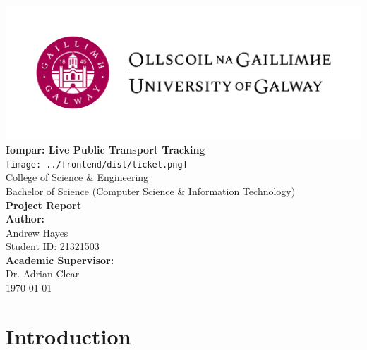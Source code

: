 \documentclass[a4paper,11pt]{report}
\author{Andrew Hayes}
\begin{document}
\begin{titlepage}
    \begin{center}

        \vfill
        \includegraphics[width=\textwidth]{./images/Logo-UGalway-2-3166136658.jpg} \\[1cm]

        {\Huge \textbf{Iompar: Live Public Transport Tracking}} \\[0.5cm]
        
        \texttt{[image: ../frontend/dist/ticket.png]} \\[1cm]

        {\Large College of Science \& Engineering} \\[0.3cm]
        {\large Bachelor of Science (Computer Science \& Information Technology)} \\[0.5cm]

        {\large \textbf{Project Report}} \\[1.5cm]

        {\Large \textbf{Author:}} \\[0.2cm]
        {\large Andrew Hayes \\ Student ID: 21321503 } \\[1cm]

        {\Large \textbf{Academic Supervisor:}} \\[0.2cm]
        {\large Dr. Adrian Clear} \\[1.5cm]

        {\Large \today}
        \vfill
    \end{center}
\end{titlepage}

\newpage
\tableofcontents
\newpage
\setcounter{page}{1}

\chapter{Introduction}
\end{document}
